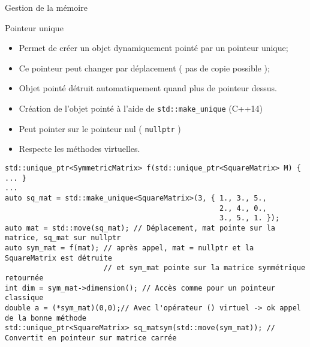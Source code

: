 \documentclass[handout,10pt]{beamer}
\begin{document}
\begin{frame}[fragile]{Gestion de la mémoire}
\tiny
\begin{block}{Pointeur unique}
\begin{itemize}
 \item Permet de créer un objet dynamiquement pointé par un pointeur unique;
 \item Ce pointeur peut changer par déplacement ( pas de copie possible );
 \item Objet pointé détruit automatiquement quand plus de pointeur dessus.
 \item Création de l'objet pointé à l'aide de \lstinline$std::make_unique$ (C++14)
 \item Peut pointer sur le pointeur nul ( \lstinline$nullptr$ )
 \item Respecte les méthodes virtuelles.
\end{itemize}
\begin{lstlisting}
std::unique_ptr<SymmetricMatrix> f(std::unique_ptr<SquareMatrix> M) { ... }
...
auto sq_mat = std::make_unique<SquareMatrix>(3, { 1., 3., 5.,
                                                  2., 4., 0.,
                                                  3., 5., 1. });
auto mat = std::move(sq_mat); // Déplacement, mat pointe sur la matrice, sq_mat sur nullptr
auto sym_mat = f(mat); // après appel, mat = nullptr et la SquareMatrix est détruite
                       // et sym_mat pointe sur la matrice symmétrique retournée                     
int dim = sym_mat->dimension(); // Accès comme pour un pointeur classique
double a = (*sym_mat)(0,0);// Avec l'opérateur () virtuel -> ok appel de la bonne méthode
std::unique_ptr<SquareMatrix> sq_matsym(std::move(sym_mat)); // Convertit en pointeur sur matrice carrée
\end{lstlisting}

\end{block}
\end{frame}
\end{document}
